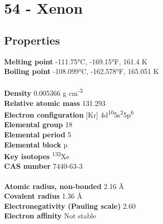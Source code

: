 \section{54 - Xenon}
\label{sec:elem-xenon}
\subsection{Properties}
\textbf{Melting point} -111.75°C, -169.15°F, 161.4 K\\
\textbf{Boiling point} -108.099°C, -162.578°F, 165.051 K\\
\\
\textbf{Density} 0.005366 g cm\textsuperscript{-3}\\
\textbf{Relative atomic mass} 131.293\\
\textbf{Electron configuration} [Kr] 4d\textsuperscript{10}5s\textsuperscript{2}5p\textsuperscript{6} \\
\textbf{Elemental group} 18\\
\textbf{Elemental period} 5\\
\textbf{Elemental block} p\\
\textbf{Key isotopes} \textsuperscript{132}Xe\\
\textbf{CAS number} 7440-63-3\\
\\
\textbf{Atomic radius, non-bonded} 2.16 Å\\
\textbf{Covalent radius} 1.36 Å\\
\textbf{Electronegativity (Pauling scale)} 2.60\\
\textbf{Electron affinity} Not stable\\